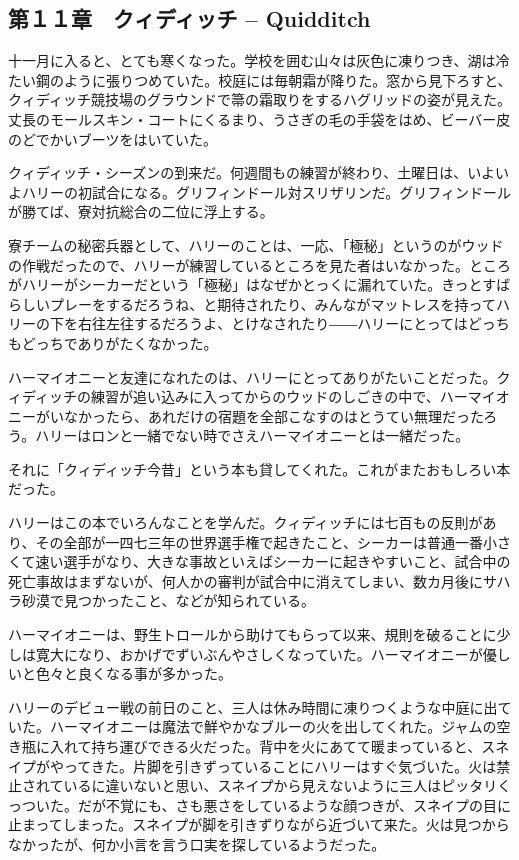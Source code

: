 \documentclass[10pt,a4paper]{article}
\begin{document}
\begin{CJK}{UTF8}{min}
\section{第１１章　クィディッチ -- Quidditch}





十一月に入ると、とても寒くなった。学校を囲む山々は灰色に凍りつき、湖は冷たい鋼のように張りつめていた。校庭には毎朝霜が降りた。窓から見下ろすと、クィディッチ競技場のグラウンドで箒の霜取りをするハグリッドの姿が見えた。丈長のモールスキン・コートにくるまり、うさぎの毛の手袋をはめ、ビーバー皮のどでかいブーツをはいていた。

クィディッチ・シーズンの到来だ。何週間もの練習が終わり、土曜日は、いよいよハリーの初試合になる。グリフィンドール対スリザリンだ。グリフィンドールが勝てば、寮対抗総合の二位に浮上する。

寮チームの秘密兵器として、ハリーのことは、一応、「極秘」というのがウッドの作戦だったので、ハリーが練習しているところを見た者はいなかった。ところがハリーがシーカーだという「極秘」はなぜかとっくに漏れていた。きっとすばらしいプレーをするだろうね、と期待されたり、みんながマットレスを持ってハリーの下を右往左往するだろうよ、とけなされたり――ハリーにとってはどっちもどっちでありがたくなかった。

ハーマイオニーと友達になれたのは、ハリーにとってありがたいことだった。クィディッチの練習が追い込みに入ってからのウッドのしごきの中で、ハーマイオニーがいなかったら、あれだけの宿題を全部こなすのはとうてい無理だったろう。ハリーはロンと一緒でない時でさえハーマイオニーとは一緒だった。

それに「クィディッチ今昔」という本も貸してくれた。これがまたおもしろい本だった。

ハリーはこの本でいろんなことを学んだ。クィディッチには七百もの反則があり、その全部が一四七三年の世界選手権で起きたこと、シーカーは普通一番小さくて速い選手がなり、大きな事故といえばシーカーに起きやすいこと、試合中の死亡事故はまずないが、何人かの審判が試合中に消えてしまい、数カ月後にサハラ砂漠で見つかったこと、などが知られている。

ハーマイオニーは、野生トロールから助けてもらって以来、規則を破ることに少しは寛大になり、おかげでずいぶんやさしくなっていた。ハーマイオニーが優しいと色々と良くなる事が多かった。



ハリーのデビュー戦の前日のこと、三人は休み時間に凍りつくような中庭に出ていた。ハーマイオニーは魔法で鮮やかなブルーの火を出してくれた。ジャムの空き瓶に入れて持ち運びできる火だった。背中を火にあてて暖まっていると、スネイプがやってきた。片脚を引きずっていることにハリーはすぐ気づいた。火は禁止されているに違いないと思い、スネイプから見えないように三人はピッタリくっついた。だが不覚にも、さも悪さをしているような顔つきが、スネイプの目に止まってしまった。スネイプが脚を引きずりながら近づいて来た。火は見つからなかったが、何か小言を言う口実を探しているようだった。


\end{CJK}
\end{document}
